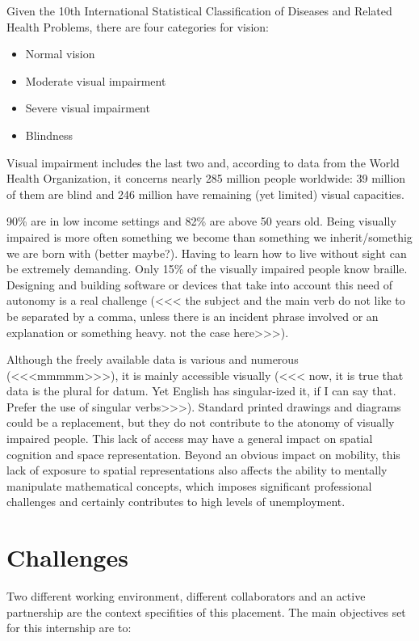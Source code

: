 Given the 10th International Statistical Classification of Diseases and
Related Health Problems, there are four categories for vision:

\begin{itemize}
\item
  Normal vision
\item
  Moderate visual impairment
\item
  Severe visual impairment
\item
  Blindness
\end{itemize}

Visual impairment includes the last two and, according to data from the World Health
Organization, it concerns nearly 285 million people worldwide: 39
million of them are blind and 246 million have remaining (yet limited) visual
capacities.

90\% are in low income settings and 82\% are above 50 years old. Being
visually impaired is more often something we become than something we inherit/somethig we are born with (better maybe?). Having to learn how to live without sight can be extremely demanding. Only 15\% of the
visually impaired people know braille. Designing and building software
or devices that take into account this need of autonomy is a real
challenge (<<< the subject and the main verb do not like to be separated by a comma, unless there is an incident phrase involved or an explanation or something heavy. not the case here>>>).

Although the freely available data is various and numerous (<<<mmmmm>>>), it is mainly accessible visually (<<< now, it is true that data is the plural for datum. Yet English has singular-ized it, if I can say that. Prefer the use of singular verbs>>>). Standard printed drawings and diagrams could be a replacement, but they do not contribute to the atonomy of visually impaired people. This lack of access may have a general impact on spatial cognition and space representation. Beyond an obvious impact on mobility, this lack of exposure to spatial representations also affects the ability to mentally manipulate mathematical concepts, which imposes significant professional challenges and certainly contributes to high levels of unemployment.

\section{Challenges}\label{Challenges}

Two different working environment, different collaborators and an active partnership are the context specifities of this placement. The main objectives set for this internship are to:

